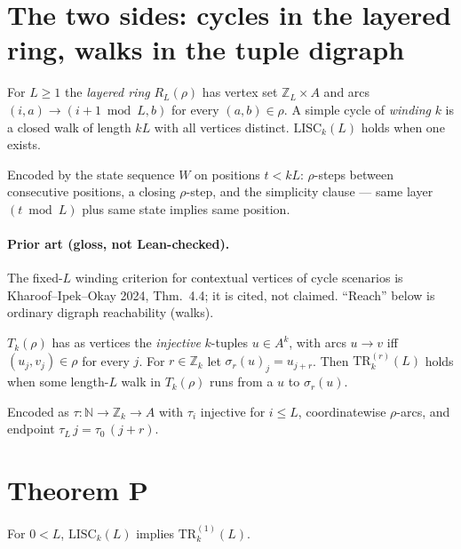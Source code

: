 \section{The two sides: cycles in the layered ring, walks in the tuple digraph}

\begin{definition}
\label{def:lisc}
\leanok
For $L \geq 1$ the \emph{layered ring} $R_L(\rho)$ has vertex set
$\mathbb{Z}_L \times A$ and arcs $(i,a) \to (i+1 \bmod L, b)$ for every
$(a,b) \in \rho$. A simple cycle of \emph{winding} $k$ is a closed walk of
length $kL$ with all vertices distinct. $\mathrm{LISC}_k(L)$ holds when one
exists.

Encoded by the state sequence $W$ on positions $t < kL$: $\rho$-steps between
consecutive positions, a closing $\rho$-step, and the simplicity clause ---
same layer $(t \bmod L)$ plus same state implies same position.
\end{definition}

\paragraph{Prior art (gloss, not Lean-checked).} The fixed-$L$ winding criterion
for contextual vertices of cycle scenarios is Kharoof--Ipek--Okay 2024,
Thm.~4.4; it is cited, not claimed. ``Reach'' below is ordinary digraph
reachability (walks).

\begin{definition}
\label{def:tr}
\leanok
$T_k(\rho)$ has as vertices the \emph{injective} $k$-tuples $u \in A^k$, with
arcs $u \to v$ iff $(u_j, v_j) \in \rho$ for every $j$. For $r \in \mathbb{Z}_k$
let $\sigma_r(u)_j = u_{j+r}$. Then $\mathrm{TR}_k^{(r)}(L)$ holds when some
length-$L$ walk in $T_k(\rho)$ runs from a $u$ to $\sigma_r(u)$.

Encoded as $\tau : \mathbb{N} \to \mathbb{Z}_k \to A$ with $\tau_i$ injective
for $i \leq L$, coordinatewise $\rho$-arcs, and endpoint
$\tau_L\,j = \tau_0\,(j+r)$.
\end{definition}

\section{Theorem P}

\begin{lemma}
\label{lem:extraction}
\leanok
{}
For $0 < L$, $\mathrm{LISC}_k(L)$ implies $\mathrm{TR}_k^{(1)}(L)$.
\end{lemma}

